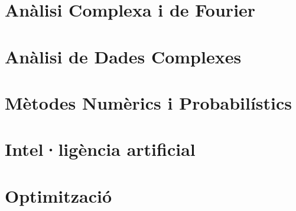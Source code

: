 \documentclass[a4paper,12pt]{article}
\author{EDUARDO PÉREZ MOTATO}
\begin{document}
    
    \tableofcontents
    \section{Anàlisi Complexa i de Fourier}
    
    \section{Anàlisi de Dades Complexes}
    
    \section{Mètodes Numèrics i Probabilístics}
    
    \section{Intel·ligència artificial}
    
    \section{Optimització}
    
\end{document}
